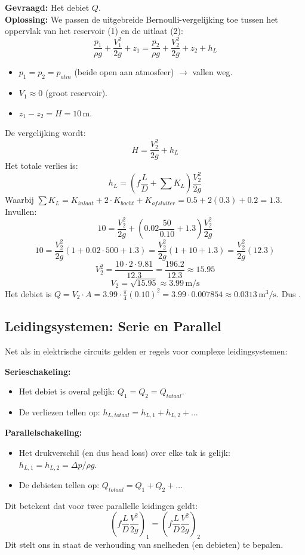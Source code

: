 \documentclass[a4paper,11pt,twoside]{report}
\begin{document}
\textbf{Gevraagd:} Het debiet $Q$.\\
\textbf{Oplossing:}
We passen de uitgebreide Bernoulli-vergelijking toe tussen het oppervlak van het reservoir (1) en de uitlaat (2):
\[ \frac{p_1}{\rho g} + \frac{V_1^2}{2g} + z_1 = \frac{p_2}{\rho g} + \frac{V_2^2}{2g} + z_2 + h_L \]
\begin{itemize}
    \item $p_1 = p_2 = p_{atm}$ (beide open aan atmosfeer) $\rightarrow$ vallen weg.
    \item $V_1 \approx 0$ (groot reservoir).
    \item $z_1 - z_2 = H = 10\,\mathrm{m}$.
\end{itemize}
De vergelijking wordt:
\[ H = \frac{V_2^2}{2g} + h_L \]
Het totale verlies is:
\[ h_L = \left( f \frac{L}{D} + \sum K_L \right) \frac{V_2^2}{2g} \]
Waarbij $\sum K_L = K_{inlaat} + 2 \cdot K_{bocht} + K_{afsluiter} = 0.5 + 2(0.3) + 0.2 = 1.3$.
Invullen:
\[ 10 = \frac{V_2^2}{2g} + \left( 0.02 \frac{50}{0.10} + 1.3 \right) \frac{V_2^2}{2g} \]
\[ 10 = \frac{V_2^2}{2g} \left( 1 + 0.02 \cdot 500 + 1.3 \right) = \frac{V_2^2}{2g} (1 + 10 + 1.3) = \frac{V_2^2}{2g} (12.3) \]
\[ V_2^2 = \frac{10 \cdot 2 \cdot 9.81}{12.3} = \frac{196.2}{12.3} \approx 15.95 \]
\[ V_2 = \sqrt{15.95} \approx 3.99\,\mathrm{m/s} \]
Het debiet is $Q = V_2 \cdot A = 3.99 \cdot \frac{\pi}{4}(0.10)^2 = 3.99 \cdot 0.007854 \approx 0.0313\,\mathrm{m^3/s}$.
Dus .

\subsection{Leidingsystemen: Serie en Parallel}
Net als in elektrische circuits gelden er regels voor complexe leidingsystemen:

\textbf{Serieschakeling:}
\begin{itemize}
    \item Het debiet is overal gelijk: $Q_1 = Q_2 = Q_{totaal}$.
    \item De verliezen tellen op: $h_{L,totaal} = h_{L,1} + h_{L,2} + \dots$
\end{itemize}

\textbf{Parallelschakeling:}
\begin{itemize}
    \item Het drukverschil (en dus head loss) over elke tak is gelijk: $h_{L,1} = h_{L,2} = \Delta p / \rho g$.
    \item De debieten tellen op: $Q_{totaal} = Q_1 + Q_2 + \dots$
\end{itemize}
Dit betekent dat voor twee parallelle leidingen geldt:
\[
\left( f \frac{L}{D} \frac{V^2}{2g} \right)_1 = \left( f \frac{L}{D} \frac{V^2}{2g} \right)_2
\]
Dit stelt ons in staat de verhouding van snelheden (en debieten) te bepalen.
\end{document}

